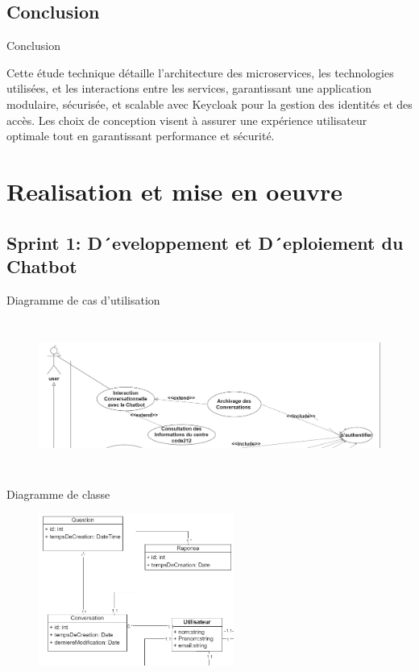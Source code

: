 \documentclass[aspectratio=169]{beamer}
\begin{document}
\subsection{Conclusion}
\begin{frame}{Conclusion}

    Cette étude technique détaille l'architecture des microservices, les technologies utilisées, et les interactions entre les services, garantissant une application modulaire, sécurisée, et scalable avec Keycloak pour la gestion des identités et des accès. Les choix de conception visent à assurer une expérience utilisateur optimale tout en garantissant performance et sécurité.
\end{frame}


\section{Realisation et mise en oeuvre}
\subsection{Sprint 1: D´eveloppement et D´eploiement du Chatbot}
\begin{frame}{Diagramme de cas d'utilisation}

    \begin{figure}[htpb]
        \centering
        \includegraphics[height=5cm]{pic/sprint1-usecase.png}
    \end{figure}
\end{frame}

\begin{frame}{Diagramme de classe}

    \begin{figure}[htpb]
        \centering
        \includegraphics[height=5cm]{pic/sprint1-class.png}
    \end{figure}
\end{frame}
\end{document}
